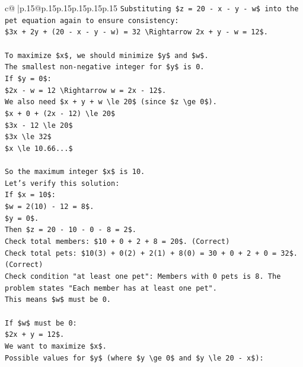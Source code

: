 \documentclass{article}
\begin{document}
{\begin{supertabular}{c@{$\;$}|p{.15\linewidth}@{}p{.15\linewidth}p{.15\linewidth}p{.15\linewidth}p{.15\linewidth}p{.15\linewidth}}
{{{\texttt{Substituting \$z = 20 {-} x {-} y {-} w\$ into the pet equation again to ensure consistency:} \\
\texttt{\$3x + 2y + (20 {-} x {-} y {-} w) = 32 \textbackslash{}Rightarrow 2x + y {-} w = 12\$.} \\
\\ 
\texttt{To maximize \$x\$, we should minimize \$y\$ and \$w\$.} \\
\texttt{The smallest non{-}negative integer for \$y\$ is 0.} \\
\texttt{If \$y = 0\$:} \\
\texttt{\$2x {-} w = 12 \textbackslash{}Rightarrow w = 2x {-} 12\$.} \\
\texttt{We also need \$x + y + w \textbackslash{}le 20\$ (since \$z \textbackslash{}ge 0\$).} \\
\texttt{\$x + 0 + (2x {-} 12) \textbackslash{}le 20\$} \\
\texttt{\$3x {-} 12 \textbackslash{}le 20\$} \\
\texttt{\$3x \textbackslash{}le 32\$} \\
\texttt{\$x \textbackslash{}le 10.66...\$} \\
\\ 
\texttt{So the maximum integer \$x\$ is 10.} \\
\texttt{Let's verify this solution:} \\
\texttt{If \$x = 10\$:} \\
\texttt{\$w = 2(10) {-} 12 = 8\$.} \\
\texttt{\$y = 0\$.} \\
\texttt{Then \$z = 20 {-} 10 {-} 0 {-} 8 = 2\$.} \\
\texttt{Check total members: \$10 + 0 + 2 + 8 = 20\$. (Correct)} \\
\texttt{Check total pets: \$10(3) + 0(2) + 2(1) + 8(0) = 30 + 0 + 2 + 0 = 32\$. (Correct)} \\
\texttt{Check condition "at least one pet": Members with 0 pets is 8. The problem states "Each member has at least one pet".} \\
\texttt{This means \$w\$ must be 0.} \\
\\ 
\texttt{If \$w\$ must be 0:} \\
\texttt{\$2x + y = 12\$.} \\
\texttt{We want to maximize \$x\$.} \\
\texttt{Possible values for \$y\$ (where \$y \textbackslash{}ge 0\$ and \$y \textbackslash{}le 20 {-} x\$):} \\
}}}
\end{supertabular}}
\end{document}
